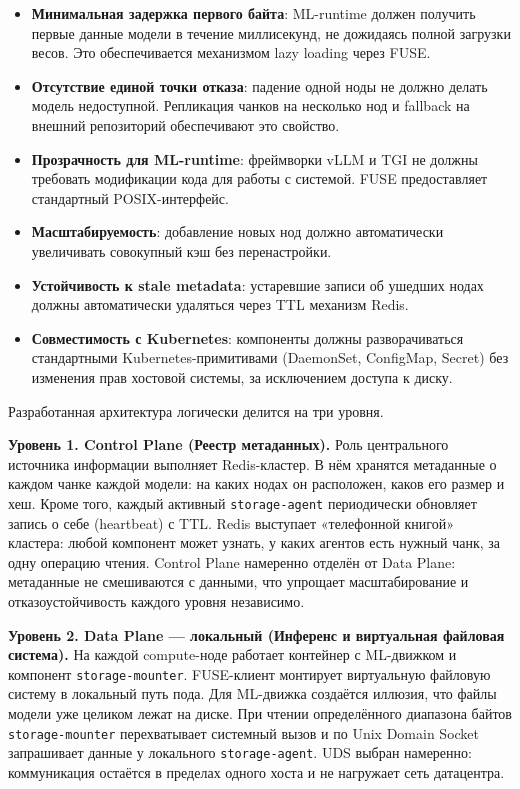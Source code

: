 \begin{itemize}[leftmargin=*]
  \item \textbf{Минимальная задержка первого байта}: ML-runtime должен получить первые данные модели в течение миллисекунд, не дожидаясь полной загрузки весов. Это обеспечивается механизмом lazy loading через FUSE.
  \item \textbf{Отсутствие единой точки отказа}: падение одной ноды не должно делать модель недоступной. Репликация чанков на несколько нод и fallback на внешний репозиторий обеспечивают это свойство.
  \item \textbf{Прозрачность для ML-runtime}: фреймворки vLLM и TGI не должны требовать модификации кода для работы с системой. FUSE предоставляет стандартный POSIX-интерфейс.
  \item \textbf{Масштабируемость}: добавление новых нод должно автоматически увеличивать совокупный кэш без перенастройки.
  \item \textbf{Устойчивость к stale metadata}: устаревшие записи об ушедших нодах должны автоматически удаляться через TTL механизм Redis.
  \item \textbf{Совместимость с Kubernetes}: компоненты должны разворачиваться стандартными Kubernetes-примитивами (DaemonSet, ConfigMap, Secret) без изменения прав хостовой системы, за исключением доступа к диску.
\end{itemize}

Разработанная архитектура логически делится на три уровня.

\textbf{Уровень 1. Control Plane (Реестр метаданных).} Роль центрального источника информации выполняет Redis-кластер. В нём хранятся метаданные о каждом чанке каждой модели: на каких нодах он расположен, каков его размер и хеш. Кроме того, каждый активный \texttt{storage-agent} периодически обновляет запись о себе (heartbeat) с TTL. Redis выступает «телефонной книгой» кластера: любой компонент может узнать, у каких агентов есть нужный чанк, за одну операцию чтения. Control Plane намеренно отделён от Data Plane: метаданные не смешиваются с данными, что упрощает масштабирование и отказоустойчивость каждого уровня независимо.

\textbf{Уровень 2. Data Plane --- локальный (Инференс и виртуальная файловая система).} На каждой compute-ноде работает контейнер с ML-движком и компонент \texttt{storage-mounter}. FUSE-клиент монтирует виртуальную файловую систему в локальный путь пода. Для ML-движка создаётся иллюзия, что файлы модели уже целиком лежат на диске. При чтении определённого диапазона байтов \texttt{storage-mounter} перехватывает системный вызов и по Unix Domain Socket запрашивает данные у локального \texttt{storage-agent}. UDS выбран намеренно: коммуникация остаётся в пределах одного хоста и не нагружает сеть датацентра.

